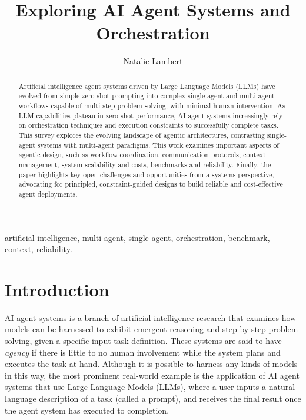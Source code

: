 \documentclass[conference]{IEEEtran}
\begin{document}
\title{Exploring AI Agent Systems and Orchestration}

\author{Natalie Lambert}

\maketitle

\begin{abstract}
Artificial intelligence agent systems driven by Large Language Models (LLMs) 
have evolved from simple zero-shot prompting into complex single-agent and multi-agent workflows
capable of multi-step problem solving, with minimal human intervention.
As LLM capabilities plateau in zero-shot performance, 
AI agent systems increasingly rely on orchestration techniques and execution constraints
to successfully complete tasks.
This survey explores the evolving landscape of agentic architectures, contrasting single-agent systems 
with multi-agent paradigms. 
This work examines important aspects of agentic design, such as workflow coordination, 
communication protocols, context management, system scalability and costs, benchmarks and reliability. 
Finally, the paper highlights key open challenges and opportunities from a systems perspective,
advocating for principled, constraint-guided designs to build reliable and cost-effective agent deployments.
\end{abstract}

\begin{IEEEkeywords}
artificial intelligence, multi-agent, single agent, orchestration, benchmark, context, reliability.
\end{IEEEkeywords}

\section{Introduction}\label{intro}
AI agent systems is a branch of artificial intelligence research that examines how
models can be harnessed to exhibit emergent reasoning and step-by-step problem-solving, given a
specific input task definition.
These systems are said to have \emph{agency} if there is little to no human involvement while the
system plans and executes the task at hand.
Although it is possible to harness any kinds of models in this way, the most prominent real-world
example is the application of AI agent systems that use Large Language Models (LLMs),
where a user inputs a natural language description of a task (called a prompt), and receives the
final result once the agent system has executed to completion.
\end{document}
